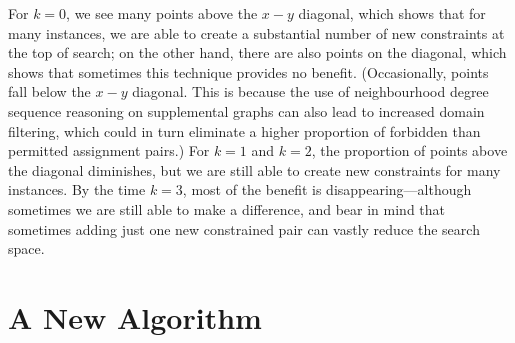 \documentclass[letterpaper]{article}
\theoremstyle{definition}
\begin{document}
For $k = 0$, we see many points above the $x-y$ diagonal, which shows that for many instances, we
are able to create a substantial number of new constraints at the top of search; on the other hand,
there are also points on the diagonal, which shows that sometimes this technique provides no
benefit. (Occasionally, points fall below the $x-y$ diagonal.  This is because the use of
neighbourhood degree sequence reasoning on supplemental graphs can also lead to increased domain
filtering, which could in turn eliminate a higher proportion of forbidden than permitted assignment
pairs.) For $k = 1$ and $k = 2$, the proportion of points above the diagonal diminishes, but we are
still able to create new constraints for many instances. By the time $k = 3$, most of the benefit is
disappearing---although sometimes we are still able to make a difference, and bear in mind that
sometimes adding just one new constrained pair can vastly reduce the search space.

\section{A New Algorithm}\label{section:algorithm}
\end{document}
